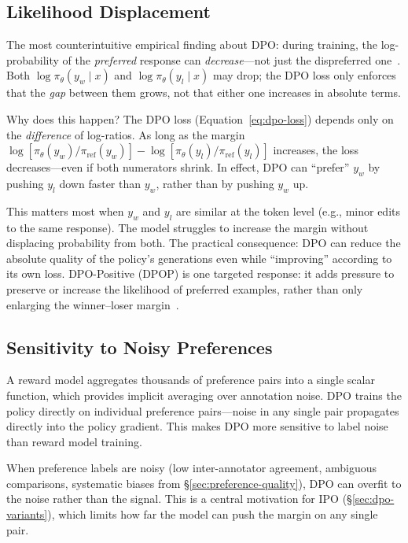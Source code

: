 \subsection{Likelihood Displacement}

The most counterintuitive empirical finding about DPO: during training, the log-probability of the \emph{preferred} response can \emph{decrease}---not just the dispreferred one~\cite{pal2024smaug, razin2024likelihood}. Both $\log \pi_\theta(y_w \mid x)$ and $\log \pi_\theta(y_l \mid x)$ may drop; the DPO loss only enforces that the \emph{gap} between them grows, not that either one increases in absolute terms.

Why does this happen? The DPO loss (Equation~\ref{eq:dpo-loss}) depends only on the \emph{difference} of log-ratios. As long as the margin $\log [\pi_\theta(y_w)/\pi_{\text{ref}}(y_w)] - \log [\pi_\theta(y_l)/\pi_{\text{ref}}(y_l)]$ increases, the loss decreases---even if both numerators shrink. In effect, DPO can ``prefer'' $y_w$ by pushing $y_l$ down faster than $y_w$, rather than by pushing $y_w$ up.

This matters most when $y_w$ and $y_l$ are similar at the token level (e.g., minor edits to the same response). The model struggles to increase the margin without displacing probability from both. The practical consequence: DPO can reduce the absolute quality of the policy's generations even while ``improving'' according to its own loss. DPO-Positive (DPOP) is one targeted response: it adds pressure to preserve or increase the likelihood of preferred examples, rather than only enlarging the winner--loser margin~\cite{pal2024smaug}.

\subsection{Sensitivity to Noisy Preferences}

A reward model aggregates thousands of preference pairs into a single scalar function, which provides implicit averaging over annotation noise. DPO trains the policy directly on individual preference pairs---noise in any single pair propagates directly into the policy gradient. This makes DPO more sensitive to label noise than reward model training.

When preference labels are noisy (low inter-annotator agreement, ambiguous comparisons, systematic biases from \S\ref{sec:preference-quality}), DPO can overfit to the noise rather than the signal. This is a central motivation for IPO (\S\ref{sec:dpo-variants}), which limits how far the model can push the margin on any single pair.

